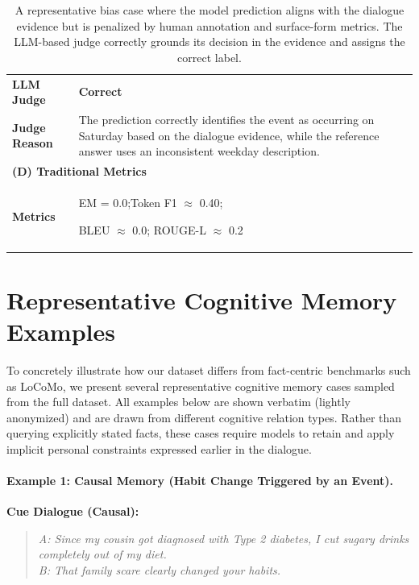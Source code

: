 \documentclass[11pt]{article}
\begin{document}
\begin{table}[t]
\begin{tabular}{p{} p{}}
\textbf{LLM Judge} &
\textbf{Correct} \\

\textbf{Judge Reason} &
The prediction correctly identifies the event as occurring on Saturday
based on the dialogue evidence, while the reference answer uses an
inconsistent weekday description. \\

\midrule
\multicolumn{2}{l}{\textbf{(D) Traditional Metrics}} \\

\textbf{Metrics} &
EM = 0.0;\quad Token F1 $\approx$ 0.40;\quad 

BLEU $\approx$ 0.0;\quad
ROUGE-L $\approx$ 0.2 \\
\bottomrule
\end{tabular}
\caption{A representative bias case where the model prediction aligns
with the dialogue evidence but is penalized by human annotation and
surface-form metrics. The LLM-based judge correctly grounds its decision
in the evidence and assigns the correct label.}
\label{tab:representative-metrics-case}
\end{table}

\section{Representative Cognitive Memory Examples}
\label{app:cognitive-examples}

To concretely illustrate how our dataset differs from fact-centric
benchmarks such as LoCoMo, we present several representative cognitive
memory cases sampled from the full dataset.
All examples below are shown verbatim (lightly anonymized) and are drawn
from different cognitive relation types.
Rather than querying explicitly stated facts, these cases require models
to retain and apply implicit personal constraints expressed earlier in
the dialogue.

\paragraph{Example 1: Causal Memory (Habit Change Triggered by an Event).}

\textbf{Cue Dialogue (Causal):}
\begin{quote}
\textit{A: Since my cousin got diagnosed with Type 2 diabetes, I cut
sugary drinks completely out of my diet.} \\
\textit{B: That family scare clearly changed your habits.}
\end{quote}
\end{document}
